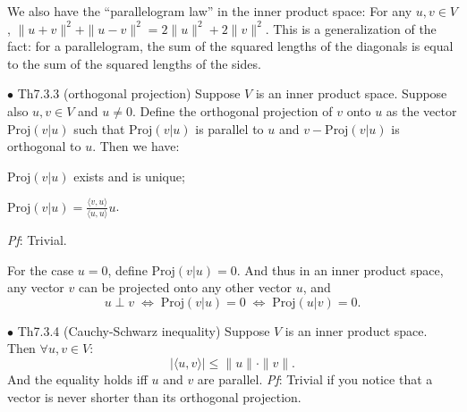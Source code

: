 \documentclass{article}
\begin{document}
\begin{Rmk}{}
    We also have the ``parallelogram law'' in the inner product space: \textcolor{Th}{For any $u, v\in V$, $\|u+v\|^2 + \|u-v\|^2 = 2\|u\|^2 + 2\|v\|^2$.} This is a generalization of the fact: for a parallelogram, the sum of the squared lengths of the diagonals is equal to the sum of the squared lengths of the sides.
\end{Rmk}

\begin{Th}{$\bullet$ Th7.3.3 (orthogonal projection)}
    Suppose $V$ is an inner product space. Suppose also $u, v\in V$ and $u\neq 0$. \textcolor{Df}{Define the orthogonal projection of $v$ onto $u$ as the vector $\text{Proj}(v|u)$ such that $\text{Proj}(v|u)$ is parallel to $u$ and $v-\text{Proj}(v|u)$ is orthogonal to $u$.} Then we have:
    \begin{compactenum}
        \item $\text{Proj}(v|u)$ exists and is unique;
        \item $\text{Proj}(v|u) = \frac{\langle v, u\rangle}{\langle u, u\rangle}u$.
    \end{compactenum}
    \tcblower
    \textit{Pf}: Trivial.
\end{Th}

\begin{Rmk}{}
    \textcolor{Df}{For the case $u=0$, define $\text{Proj}(v|u) = 0$.} And thus \textcolor{Th}{in an inner product space, any vector $v$ can be projected onto any other vector $u$, and
    $$u \perp v \;\Leftrightarrow\; \text{Proj}(v|u) = 0 \;\Leftrightarrow\; \text{Proj}(u|v) = 0.$$}
\end{Rmk}

\begin{Th}{$\bullet$ Th7.3.4 (Cauchy-Schwarz inequality)}
    Suppose $V$ is an inner product space. Then $\forall u, v\in V$: 
    $$|\langle u, v\rangle | \leq \|u\|\cdot \|v\|.$$
    And the equality holds iff $u$ and $v$ are parallel.
    \tcblower
    \textit{Pf}: Trivial if you notice that a vector is never shorter than its orthogonal projection.
\end{Th}
\end{document}
